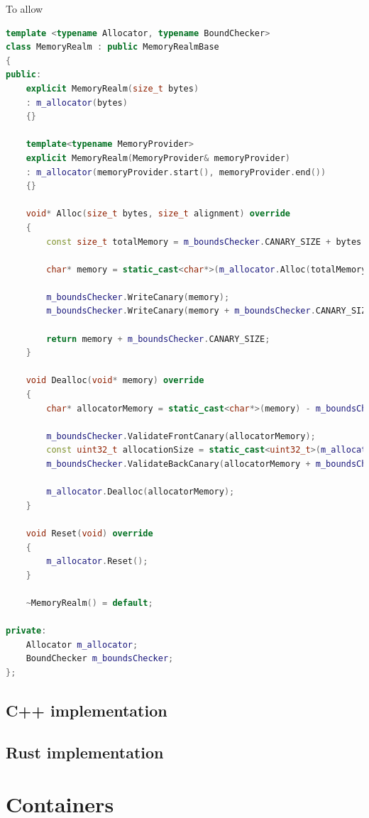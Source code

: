 To allow 


\begin{lstlisting}[caption={Implementation of the memory realm in C++. Some implementation deatils were omitted (special member functions, ...)}, label={lst:cpp_mem_realm}, language={C++}]
template <typename Allocator, typename BoundChecker>
class MemoryRealm : public MemoryRealmBase
{
public:
	explicit MemoryRealm(size_t bytes)
	: m_allocator(bytes)
	{}
	
	template<typename MemoryProvider>
	explicit MemoryRealm(MemoryProvider& memoryProvider)
	: m_allocator(memoryProvider.start(), memoryProvider.end())
	{}
	
	void* Alloc(size_t bytes, size_t alignment) override
	{
		const size_t totalMemory = m_boundsChecker.CANARY_SIZE + bytes + m_boundsChecker.CANARY_SIZE;
		
		char* memory = static_cast<char*>(m_allocator.Alloc(totalMemory, alignment, m_boundsChecker.CANARY_SIZE));
		
		m_boundsChecker.WriteCanary(memory);
		m_boundsChecker.WriteCanary(memory + m_boundsChecker.CANARY_SIZE + bytes);
		
		return memory + m_boundsChecker.CANARY_SIZE;
	}
	
	void Dealloc(void* memory) override
	{
		char* allocatorMemory = static_cast<char*>(memory) - m_boundsChecker.CANARY_SIZE;
		
		m_boundsChecker.ValidateFrontCanary(allocatorMemory);
		const uint32_t allocationSize = static_cast<uint32_t>(m_allocator.GetAllocationSize(allocatorMemory));
		m_boundsChecker.ValidateBackCanary(allocatorMemory + m_boundsChecker.CANARY_SIZE + allocationSize);
		
		m_allocator.Dealloc(allocatorMemory);
	}
	
	void Reset(void) override
	{
		m_allocator.Reset();
	}
	
	~MemoryRealm() = default;

private:
	Allocator m_allocator;
	BoundChecker m_boundsChecker;
};
\end{lstlisting}

\subsection{C++ implementation}
\blindtext
\subsection{Rust implementation}
\blindtext
\section{Containers} \label{container_impl}
\blindtext

